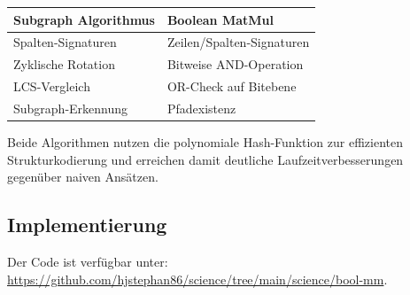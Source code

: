 ﻿\documentclass[a4paper,12pt]{article}
\theoremstyle{definition}
\begin{document}
\begin{center}
	\begin{tabular}{|l|l|}
		\hline
		\textbf{Subgraph Algorithmus} & \textbf{Boolean MatMul} \\
		\hline
		Spalten-Signaturen & Zeilen/Spalten-Signaturen \\
		Zyklische Rotation & Bitweise AND-Operation \\
		LCS-Vergleich & OR-Check auf Bitebene \\
		Subgraph-Erkennung & Pfadexistenz \\
		\hline
	\end{tabular}
\end{center}

Beide Algorithmen nutzen die polynomiale Hash-Funktion zur effizienten Strukturkodierung und erreichen damit deutliche Laufzeitverbesserungen gegenüber naiven Ansätzen.

\subsection{Implementierung}

Der Code ist verfügbar unter: \url{https://github.com/hjstephan86/science/tree/main/science/bool-mm}.	
\end{document}

